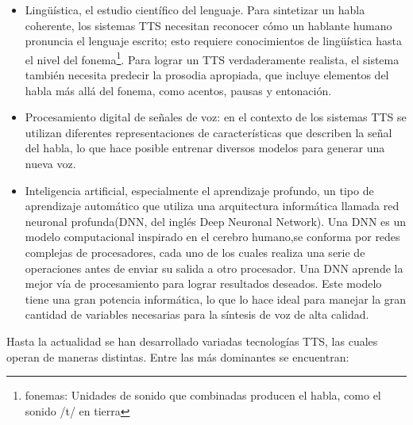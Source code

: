 \begin{itemize}
	\item Lingüística, el estudio científico del lenguaje. Para sintetizar un habla coherente, los sistemas TTS necesitan reconocer cómo un hablante humano pronuncia el lenguaje escrito; esto requiere conocimientos de lingüística hasta el nivel del fonema\footnote{fonemas: Unidades de sonido que combinadas producen el habla, como el sonido /t/ en tierra}. Para lograr un TTS verdaderamente realista, el sistema también necesita predecir la prosodia apropiada, que incluye elementos del habla más allá del fonema, como acentos, pausas y entonación.
	
	\item Procesamiento digital de señales de voz: en el contexto de los sistemas TTS se	utilizan diferentes representaciones de características que describen la señal del habla, lo que hace posible entrenar diversos modelos para generar una nueva
	voz.
	
	\item Inteligencia artificial, especialmente el aprendizaje profundo, un tipo de aprendizaje automático que utiliza una arquitectura informática llamada red neuronal profunda(DNN, del inglés Deep Neuronal Network). Una DNN es un modelo computacional inspirado en el cerebro humano,se conforma por redes complejas de procesadores, cada uno de los cuales realiza una serie de operaciones antes de enviar su salida a otro procesador. Una DNN aprende la mejor vía de procesamiento para lograr resultados deseados. Este modelo tiene una gran potencia informática, lo que lo hace ideal para manejar la gran cantidad de variables necesarias para la síntesis de voz de alta calidad.
\end{itemize}


Hasta la actualidad se han desarrollado variadas tecnologías TTS, las cuales operan de maneras distintas. Entre las más dominantes se encuentran: 

